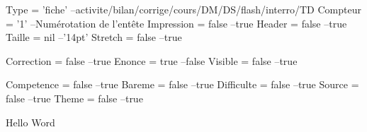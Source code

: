 \documentclass{classe-tex3R}
\begin{document}
\begin{luacode}
  Type = 'fiche' --activite/bilan/corrige/cours/DM/DS/flash/interro/TD
  Compteur = '1' --Numérotation de l'entête
  Impression = false --true
  Header = false --true
  Taille = nil --'14pt'
  Stretch = false --true

  Correction = false --true
  Enonce = true --false
  Visible = false --true

  Competence = false --true
  Bareme = false --true
  Difficulte = false --true
  Source = false --true
  Theme = false --true
\end{luacode}
\parametrage


Hello Word
\end{document}
